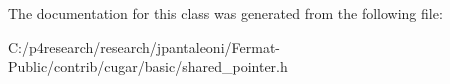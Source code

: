 The documentation for this class was generated from the following file\+:\begin{DoxyCompactItemize}
\item 
C\+:/p4research/research/jpantaleoni/\+Fermat-\/\+Public/contrib/cugar/basic/shared\+\_\+pointer.\+h\end{DoxyCompactItemize}
